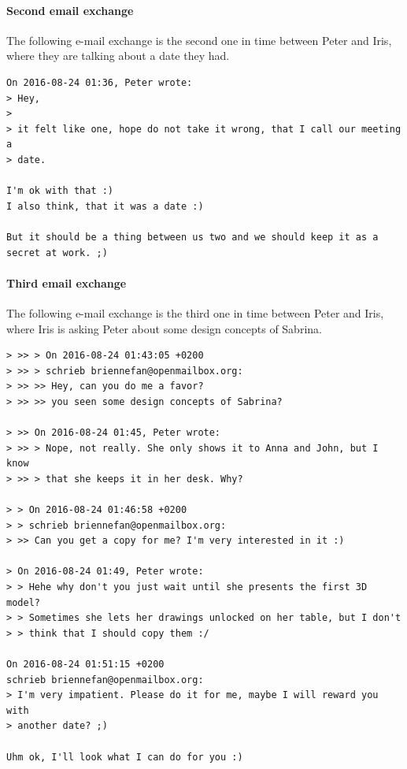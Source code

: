 \documentclass[12pt]{article}
\begin{document}
\paragraph{Second email exchange}
The following e-mail exchange is the second one in time between Peter and Iris, where they are talking about a date they had.

\begin{shaded}
\begin{verbatim}
On 2016-08-24 01:36, Peter wrote:
> Hey,
> 
> it felt like one, hope do not take it wrong, that I call our meeting a
> date.

I'm ok with that :)
I also think, that it was a date :)

But it should be a thing between us two and we should keep it as a 
secret at work. ;)
\end{verbatim}
\end{shaded}

\paragraph{Third email exchange}
The following e-mail exchange is the third one in time between Peter and Iris, where Iris is asking Peter about some design concepts of Sabrina.

\begin{shaded}
\begin{verbatim}
> >> > On 2016-08-24 01:43:05 +0200
> >> > schrieb briennefan@openmailbox.org:
> >> >> Hey, can you do me a favor?
> >> >> you seen some design concepts of Sabrina?

> >> On 2016-08-24 01:45, Peter wrote:
> >> > Nope, not really. She only shows it to Anna and John, but I know
> >> > that she keeps it in her desk. Why?

> > On 2016-08-24 01:46:58 +0200
> > schrieb briennefan@openmailbox.org:
> >> Can you get a copy for me? I'm very interested in it :)

> On 2016-08-24 01:49, Peter wrote:
> > Hehe why don't you just wait until she presents the first 3D model?
> > Sometimes she lets her drawings unlocked on her table, but I don't
> > think that I should copy them :/

On 2016-08-24 01:51:15 +0200
schrieb briennefan@openmailbox.org:
> I'm very impatient. Please do it for me, maybe I will reward you with 
> another date? ;)

Uhm ok, I'll look what I can do for you :)
\end{verbatim}
\end{shaded}
\end{document}
